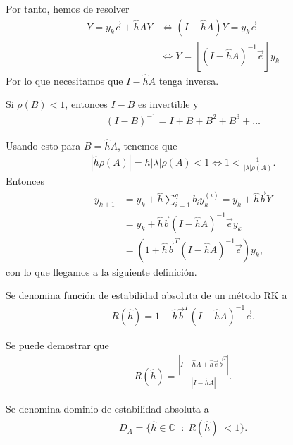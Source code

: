 Por tanto, hemos de resolver
\begin{align*}
    Y = y_k \overrightarrow{e} + \hat{h} AY &\Longleftrightarrow (I -\hat{h}A)Y = y_k \overrightarrow{e} \\
    &\Longleftrightarrow Y = [(I -\hat{h}A)^{-1} \overrightarrow{e}]y_k
\end{align*}
Por lo que necesitamos que $I - \hat{h}A$ tenga inversa.

\begin{obs}
Si $\rho(B) < 1$, entonces $I - B$ es invertible y 
\begin{align*}
    (I-B)^{-1} = I + B +  B^2 + B^3 + \ldots
\end{align*}
\end{obs}
\noindent Usando esto para $B = \hat{h}A$, tenemos que
\begin{align*}
    |\hat{h}\rho(A)| = h|\lambda|\rho(A) < 1 \Longleftrightarrow 1 < \frac{1}{|\lambda|\rho(A)}.
\end{align*}
Entonces
\begin{align*}
    y_{k+1} &= y_k + \hat{h} \sum_{i=1}^{q} b_i y_k^{(i)} = y_k + \hat{h}  \overrightarrow{b}Y \\
    &= y_k + \hat{h} \overrightarrow{b}(I - \hat{h}A)^{-1}\overrightarrow{e}y_k \\
    &= (1 + \hat{h}\overrightarrow{b}^{T}(I - \hat{h}A)^{-1}\overrightarrow{e}) y_k,
\end{align*}
con lo que llegamos a la siguiente definición.
\begin{defi}
Se denomina función de estabilidad absoluta de un método RK a
\begin{align*}
    R(\hat{h}) = 1 + \hat{h}\overrightarrow{b}^{T}(I - \hat{h}A)^{-1}\overrightarrow{e}.
\end{align*}
\end{defi}

\begin{obs}
Se puede demostrar que
\begin{align*}
    R(\hat{h}) = \frac{|I - \hat{h}A + \hat{h}\overrightarrow{e}\overrightarrow{b}^T|}{|I - \hat{h}A|}.
\end{align*}
\end{obs}

\begin{defi}
Se denomina dominio de estabilidad absoluta a
\begin{align*}
    D_A = \{ \hat{h} \in \mathbb{C}^- : |R(\hat{h})| < 1\}.
\end{align*}
\end{defi}

